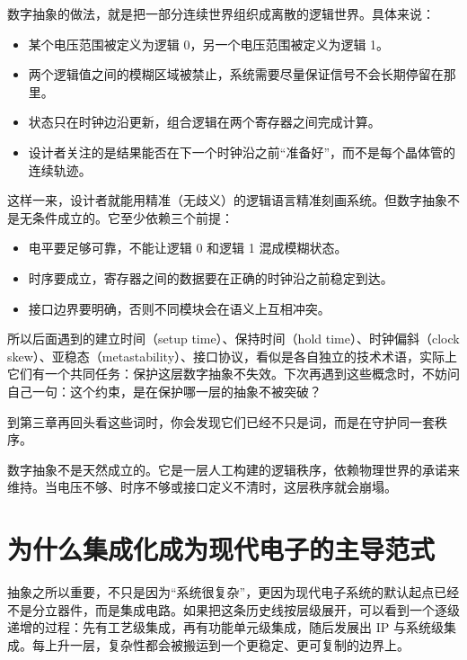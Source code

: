 \documentclass[11pt,a4paper]{article}
\begin{document}
数字抽象的做法，就是把一部分连续世界组织成离散的逻辑世界。具体来说：

\begin{itemize}
  \item 某个电压范围被定义为逻辑 0，另一个电压范围被定义为逻辑 1。
  \item 两个逻辑值之间的模糊区域被禁止，系统需要尽量保证信号不会长期停留在那里。
  \item 状态只在时钟边沿更新，组合逻辑在两个寄存器之间完成计算。
  \item 设计者关注的是结果能否在下一个时钟沿之前``准备好''，而不是每个晶体管的连续轨迹。
\end{itemize}

这样一来，设计者就能用精准（无歧义）的逻辑语言精准刻画系统。但数字抽象不是无条件成立的。它至少依赖三个前提：

\begin{itemize}
  \item 电平要足够可靠，不能让逻辑 0 和逻辑 1 混成模糊状态。
  \item 时序要成立，寄存器之间的数据要在正确的时钟沿之前稳定到达。
  \item 接口边界要明确，否则不同模块会在语义上互相冲突。
\end{itemize}

所以后面遇到的建立时间（setup time）、保持时间（hold time）、时钟偏斜（clock skew）、亚稳态（metastability）、接口协议，看似是各自独立的技术术语，实际上它们有一个共同任务：保护这层数字抽象不失效。下次再遇到这些概念时，不妨问自己一句：这个约束，是在保护哪一层的抽象不被突破？

到第三章再回头看这些词时，你会发现它们已经不只是词，而是在守护同一套秩序。

\begin{warnbox}
数字抽象不是天然成立的。它是一层人工构建的逻辑秩序，依赖物理世界的承诺来维持。当电压不够、时序不够或接口定义不清时，这层秩序就会崩塌。
\end{warnbox}

\section{为什么集成化成为现代电子的主导范式}

抽象之所以重要，不只是因为``系统很复杂''，更因为现代电子系统的默认起点已经不是分立器件，而是集成电路。如果把这条历史线按层级展开，可以看到一个逐级递增的过程：先有工艺级集成，再有功能单元级集成，随后发展出 IP 与系统级集成。每上升一层，复杂性都会被搬运到一个更稳定、更可复制的边界上。
\end{document}
